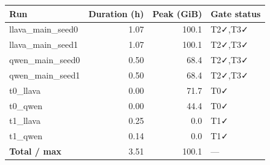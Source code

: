 \begin{tabular}{lrrl}
\hline
Run & Duration (h) & Peak (GiB) & Gate status \\
\hline
llava\_main\_seed0 & 1.07 & 100.1 & T2✓,T3✓ \\
llava\_main\_seed1 & 1.07 & 100.1 & T2✓,T3✓ \\
qwen\_main\_seed0 & 0.50 & 68.4 & T2✓,T3✓ \\
qwen\_main\_seed1 & 0.50 & 68.4 & T2✓,T3✓ \\
t0\_llava & 0.00 & 71.7 & T0✓ \\
t0\_qwen & 0.00 & 44.4 & T0✓ \\
t1\_llava & 0.25 & 0.0 & T1✓ \\
t1\_qwen & 0.14 & 0.0 & T1✓ \\
\hline
\textbf{Total / max} & 3.51 & 100.1 & --- \\
\hline
\end{tabular}
